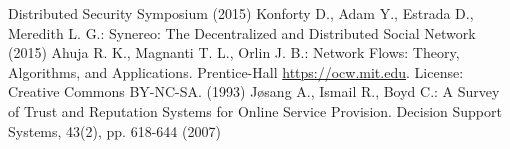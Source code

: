 \begin{thebibliography}{40}
  Distributed Security Symposium (2015)
  Konforty D., Adam Y., Estrada D., Meredith L. G.: Synereo: The Decentralized and Distributed Social Network (2015)
  \ifdefined\proceedings
  \else
    Ahuja R. K., Magnanti T. L., Orlin J. B.: Network Flows: Theory, Algorithms, and Applications. Prentice-Hall
    \url{https://ocw.mit.edu}. License: Creative Commons BY-NC-SA. (1993)
    J\o{}sang A., Ismail R., Boyd C.: A Survey of Trust and Reputation Systems for Online Service Provision. Decision Support
    Systems, 43(2), pp. 618-644 (2007)
  \fi
\end{thebibliography}

